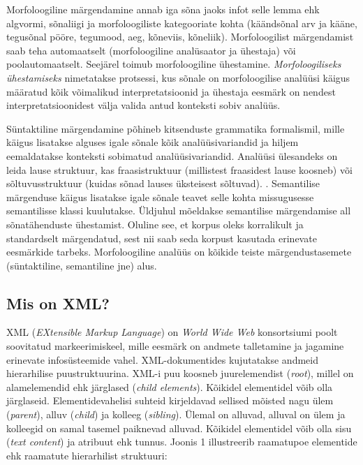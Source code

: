 \documentclass[12pt]{article}
\begin{document}
Morfoloogiline märgendamine annab iga sõna jaoks infot selle lemma ehk algvormi, sõnaliigi ja morfoloogiliste kategooriate kohta (käändsõnal arv ja kääne, tegusõnal pööre, tegumood, aeg, kõneviis, kõneliik). Morfoloogilist märgendamist saab teha automaatselt (morfoloogiline analüsaator ja ühestaja) või poolautomaatselt. Seejärel toimub morfoloogiline ühestamine. \emph{Morfoloogiliseks ühestamiseks} nimetatakse protsessi, kus sõnale on morfoloogilise analüüsi käigus määratud kõik võimalikud interpretatsioonid ja ühestaja eesmärk on nendest interpretatsioonidest välja valida antud konteksti sobiv analüüs.\citep{KV}

Süntaktiline märgendamine põhineb kitsenduste grammatika formalismil, mille käigus lisatakse alguses igale sõnale kõik analüüsivariandid ja hiljem eemaldatakse konteksti sobimatud analüüsivariandid. Analüüsi ülesandeks on leida lause struktuur, kas fraasistruktuur (millistest fraasidest lause koosneb) või sõltuvusstruktuur (kuidas sõnad lauses üksteisest sõltuvad). \citep[13, 17]{M2000}. Semantilise märgenduse käigus lisatakse igale sõnale teavet selle kohta missugusesse semantilisse klassi kuulutakse. Üldjuhul mõeldakse semantilise
märgendamise all sõnatähenduste ühestamist. Oluline see, et korpus oleks korralikult ja standardselt märgendatud,
sest nii saab seda korpust kasutada erinevate eesmärkide tarbeks. Morfoloogiline analüüs on kõikide teiste märgendustasemete (süntaktiline, semantiline jne) alus. \citep[13--14]{KR}

\subsection{Mis on XML?}

XML (\emph{EXtensible Markup Language}) on \emph{World Wide Web} konsortsiumi poolt soovitatud markeerimiskeel, mille eesmärk on andmete talletamine ja jagamine erinevate infosüsteemide vahel. XML-dokumentides kujutatakse andmeid hierarhilise puustruktuurina. XML-i puu koosneb juurelemendist (\emph{root}), millel on alamelemendid ehk järglased (\emph{child elements}). Kõikidel elementidel võib olla järglaseid. Elementidevahelisi suhteid kirjeldavad sellised mõisted nagu ülem (\emph{parent}), alluv (\emph{child}) ja kolleeg (\emph{sibling}). Ülemal on alluvad, alluval on ülem ja kolleegid on samal tasemel paiknevad alluvad. Kõikidel elementidel võib olla sisu (\emph{text content}) ja atribuut ehk tunnus. \citep{XML} Joonis 1 illustreerib raamatupoe elementide ehk raamatute hierarhilist struktuuri:
\end{document}
